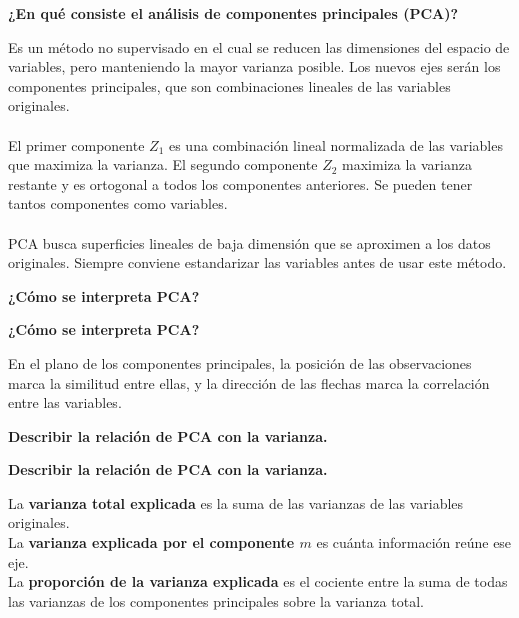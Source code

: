 \documentclass[10pt]{memoir}
\begin{document}
\clearpage
\begin{center}
	\textbf{\Large ¿En qué consiste el análisis de componentes principales (PCA)?} \\
\end{center}
\noindent Es un método no supervisado en el cual se reducen las dimensiones del espacio de variables, pero manteniendo la mayor varianza posible. Los nuevos ejes serán los componentes principales, que son combinaciones lineales de las variables originales.\\
\\
\noindent El primer componente $Z_{1}$ es una combinación lineal normalizada de las variables que maximiza la varianza. El segundo componente $Z_{2}$ maximiza la varianza restante y es ortogonal a todos los componentes anteriores. Se pueden tener tantos componentes como variables. \\
\\
\noindent PCA busca superficies lineales de baja dimensión que se aproximen a los datos originales. Siempre conviene estandarizar las variables antes de usar este método.

\clearpage
\begin{center}
	\textbf{\Large ¿Cómo se interpreta PCA?} \\
\end{center}

\clearpage
\begin{center}
	\textbf{\Large ¿Cómo se interpreta PCA?} \\
\end{center}
\noindent En el plano de los componentes principales, la posición de las observaciones marca la similitud entre ellas, y la dirección de las flechas marca la correlación entre las variables.

\clearpage
\begin{center}
	\textbf{\Large Describir la relación de PCA con la varianza.} \\
\end{center}

\clearpage
\begin{center}
	\textbf{\Large Describir la relación de PCA con la varianza.} \\
\end{center}
\noindent La \textbf{varianza total explicada} es la suma de las varianzas de las variables originales. \\
La \textbf{varianza explicada por el componente $m$} es cuánta información reúne ese eje. \\
La \textbf{proporción de la varianza explicada} es el cociente entre la suma de todas las varianzas de los componentes principales sobre la varianza total.
\end{document}
